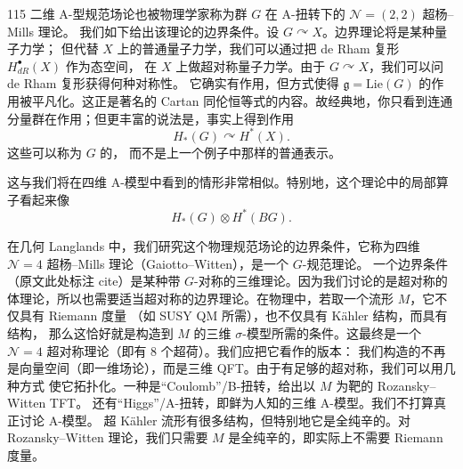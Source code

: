 \begin{srcex}{115}
二维 A-型规范场论也被物理学家称为群 $G$ 在 A-扭转下的 $\mathcal N=(2,2)$ 超杨--Mills 理论。
我们如下给出该理论的边界条件。设 $G\curvearrowright X$。边界理论将是某种量子力学；
但代替 $X$ 上的普通量子力学，我们可以通过把 de Rham 复形 $H^{\bullet}_{dR}(X)$ 作为态空间，
在 $X$ 上做超对称量子力学。由于 $G\curvearrowright X$，我们可以问 de Rham 复形获得何种对称性。
它确实有作用，但方式使得 $\mathfrak g=\mathrm{Lie}(G)$ 的作用被平凡化。这正是著名的
Cartan 同伦恒等式的内容。故经典地，你只看到连通分量群在作用；但更丰富的说法是，事实上得到作用
\begin{equation}\tag{17.1}\label{eq:17.1}
H_*(G)\curvearrowright H^*(X).
\end{equation}
这些可以称为 $G$ 的，
而不是上一个例子中那样的普通表示。
\end{srcex}

这与我们将在四维 A-模型中看到的情形非常相似。特别地，这个理论中的局部算子看起来像
\begin{equation}\tag{17.2}\label{eq:17.2}
H_*(G)\otimes H^*(BG).
\end{equation}


在几何 Langlands 中，我们研究这个物理规范场论的边界条件，它称为四维
$\mathcal N=4$ 超杨--Mills 理论（Gaiotto--Witten），是一个 $G$-规范理论。
一个边界条件（原文此处标注 cite）是某种带 $G$-对称的三维理论。因为我们讨论的是超对称的
体理论，所以也需要适当超对称的边界理论。在物理中，若取一个流形 $M$，它不仅具有 Riemann 度量
（如 SUSY QM 所需），也不仅具有 Kähler 结构，而具有结构，
那么这恰好就是构造到 $M$ 的三维 $\sigma$-模型所需的条件。这最终是一个 $\mathcal N=4$
超对称理论（即有 8 个超荷）。我们应把它看作的版本：
我们构造的不再是向量空间（即一维场论），而是三维 QFT。由于有足够的超对称，我们可以用几种方式
使它拓扑化。一种是“Coulomb”/B-扭转，给出以 $M$ 为靶的 Rozansky--Witten TFT。
还有“Higgs”/A-扭转，即鲜为人知的三维 A-模型。我们不打算真正讨论 A-模型。
超 Kähler 流形有很多结构，但特别地它是全纯辛的。对 Rozansky--Witten 理论，我们只需要 $M$
是全纯辛的，即实际上不需要 Riemann 度量。


